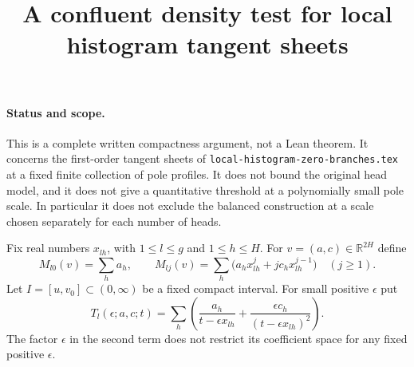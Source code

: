 \documentclass[11pt]{article}
\title{A confluent density test for local histogram tangent sheets}
\author{}\date{}
\begin{document}
\maketitle
\paragraph{Status and scope.}
This is a complete written compactness argument, not a Lean theorem.
It concerns the first-order tangent sheets of
\texttt{local-histogram-zero-branches.tex} at a fixed finite collection
of pole profiles. It does not bound the original head model, and it
does not give a quantitative threshold at a polynomially small pole
scale. In particular it does not exclude the balanced construction
at a scale chosen separately for each number of heads.

Fix real numbers $x_{lh}$, with $1\leq l\leq g$ and
$1\leq h\leq H$. For $v=(a,c)\in\mathbb R^{2H}$ define
\[
 M_{l0}(v)=\sum_h a_h,\qquad
 M_{lj}(v)=\sum_h\bigl(a_hx_{lh}^{j}
                  +j c_hx_{lh}^{j-1}\bigr)\quad(j\geq1).
                                                               \tag{1}
\]
Let $I=[u,v_0]\subset(0,\infty)$ be a fixed compact interval.
For small positive $\epsilon$ put
\[
 T_l(\epsilon;a,c;t)=\sum_h\left(
       \frac{a_h}{t-\epsilon x_{lh}}
       +\frac{\epsilon c_h}{(t-\epsilon x_{lh})^2}\right).
                                                               \tag{2}
\]
The factor $\epsilon$ in the second term does not restrict its
coefficient space for any fixed positive $\epsilon$.
\end{document}
